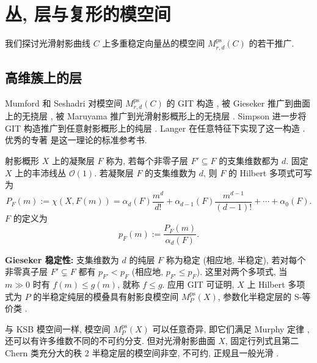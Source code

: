 \section{丛, 层与复形的模空间}\label{src:10.2}
我们探讨光滑射影曲线 $C$ 上多重稳定向量丛的模空间 $M_{r,d}^{\mathrm{ps}}(C)$ 的若干推广.

\subsection{高维簇上的层}\label{src:10.2.1-subsection}
Mumford 和 Seshadri 对模空间 $M_{r,d}^{\mathrm{ps}}(C)$ 的 GIT 构造 \cite{Mum63,Ses67}, 被 Gieseker 推广到曲面上的无挠层 \cite{Gie77a}, 被 Maruyama 推广到光滑射影概形上的无挠层 \cite{Mar78}. Simpson 进一步将 GIT 构造推广到任意射影概形上的纯层 \cite{Sim94a}. Langer 在任意特征下实现了这一构造 \cite{Lan04}. 优秀的专著 \cite{HL10} 是这一理论的标准参考书.

射影概形 $X$ 上的凝聚层 $F$ 称为, 若每个非零子层 $F'\subseteq F$ 的支集维数都为 $d$. 固定 $X$ 上的丰沛线丛 $\mathcal O(1)$. 若凝聚层 $F$ 的支集维数为 $d$, 则 $F$ 的 Hilbert 多项式可写为
\[
P_F(m):=\chi(X,F(m))=\alpha_d(F)\frac{m^d}{d!}+\alpha_{d-1}(F)\frac{m^{d-1}}{(d-1)!}+\cdots+\alpha_0(F).
\]
$F$ 的定义为
\[
p_F(m):=\frac{P_F(m)}{\alpha_d(F)}.
\]

\textbf{Gieseker 稳定性:} 支集维数为 $d$ 的纯层 $F$ 称为稳定 (相应地, 半稳定), 若对每个非零真子层 $F'\subsetneq F$ 都有 $p_{F'}<p_F$ (相应地, $p_{F'}\leq p_F$). 这里对两个多项式, 当 $m\gg0$ 时有 $f(m)\leq g(m)$, 就称 $f\leq g$. 应用 GIT 可证明, $X$ 上 Hilbert 多项式为 $P$ 的半稳定纯层的模叠具有射影良模空间 $M_P^{\mathrm{ps}}(X)$, 参数化半稳定层的 S-等价类 \cite[定理 4.3.4]{HL10}.

与 KSB 模空间一样, 模空间 $M_P^{\mathrm{ps}}(X)$ 可以任意奇异, 即它们满足 Murphy 定律 \cite{Vak06}, 还可以有许多维数不同的不可约分支. 但对光滑射影曲面 $X$, 固定行列式且第二 Chern 类充分大的秩 $2$ 半稳定层的模空间非空, 不可约, 正规且一般光滑 \cite{Li94}.

